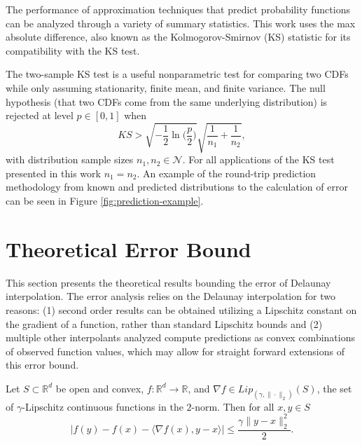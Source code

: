 \documentclass[smallextended,final]{svjour3}       %
\begin{document}
The performance of approximation techniques that predict probability functions can be analyzed through a variety of summary statistics. This work uses the max absolute difference, also known as the Kolmogorov-Smirnov (KS) statistic \cite{lilliefors1967kolmogorov} for its compatibility with the KS test.

The two-sample KS test is a useful nonparametric test for comparing two CDFs while only assuming stationarity, finite mean, and finite variance. The null hypothesis (that two CDFs come from the same underlying distribution) is rejected at level $p \in [0,1]$ when
$$ KS > \sqrt{-\frac{1}{2}\ln\biggl(\frac{p}{2}\biggr)} \sqrt{\frac{1}{n_1} + \frac{1}{n_2}}, $$
with distribution sample sizes $n_1,n_2 \in \mathcal{N}$. For all applications of the KS test presented in this work $n_1 = n_2$. An example of the round-trip prediction methodology from known and predicted distributions to the calculation of error can be seen in Figure \ref{fig:prediction-example}.

\section{Theoretical Error Bound}
\label{sec:theory}

This section presents the theoretical results bounding the error of Delaunay interpolation. The error analysis relies on the Delaunay interpolation for two reasons: (1) second order results can be obtained utilizing a Lipschitz constant on the gradient of a function, rather than standard Lipschitz bounds and (2) multiple other interpolants analyzed compute predictions as convex combinations of observed function values, which may allow for straight forward extensions of this error bound.

\begin{plainlemma}
  \label{lemma:1}
  Let $S \subset \mathbb{R}^d$ be open and convex, $f: \mathbb{R}^d \rightarrow \mathbb{R}$, and $\nabla f \in Lip_{(\gamma,\|\cdot\|_2)}(S)$, the set of $\gamma$-Lipschitz continuous functions in the $2$-norm. Then for all $x,y \in S$
  $$\big|f(y) - f(x) - \langle \nabla f(x), y - x \rangle \big| \leq \frac{\gamma \|y - x\|_2^2}{2}.$$
\end{plainlemma}
\end{document}
